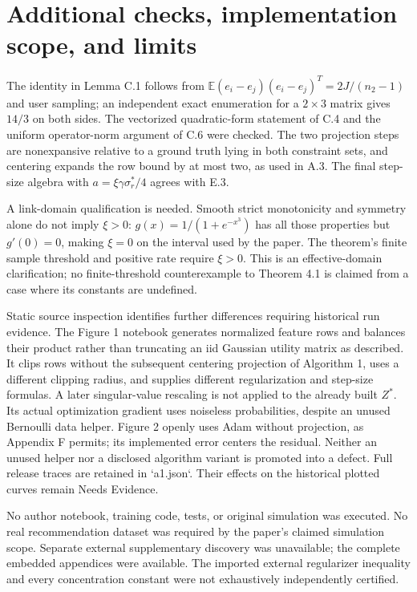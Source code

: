 \documentclass[10pt]{article}
\begin{document}
\section*{Additional checks, implementation scope, and limits}
The identity in Lemma C.1 follows from \(\mathbb E(e_i-e_j)(e_i-e_j)^T=2J/(n_2-1)\) and user sampling; an independent exact enumeration for a \(2\times3\) matrix gives \(14/3\) on both sides. The vectorized quadratic-form statement of C.4 and the uniform operator-norm argument of C.6 were checked. The two projection steps are nonexpansive relative to a ground truth lying in both constraint sets, and centering expands the row bound by at most two, as used in A.3. The final step-size algebra with \(a=\xi\gamma\sigma_r^*/4\) agrees with E.3.\par
A link-domain qualification is needed. Smooth strict monotonicity and symmetry alone do not imply \(\xi>0\): \(g(x)=1/(1+e^{-x^3})\) has all those properties but \(g'(0)=0\), making \(\xi=0\) on the interval used by the paper. The theorem’s finite sample threshold and positive rate require \(\xi>0\). This is an effective-domain clarification; no finite-threshold counterexample to Theorem 4.1 is claimed from a case where its constants are undefined.\par
Static source inspection identifies further differences requiring historical run evidence. The Figure 1 notebook generates normalized feature rows and balances their product rather than truncating an iid Gaussian utility matrix as described. It clips rows without the subsequent centering projection of Algorithm 1, uses a different clipping radius, and supplies different regularization and step-size formulas. A later singular-value rescaling is not applied to the already built \(Z^*\). Its actual optimization gradient uses noiseless probabilities, despite an unused Bernoulli data helper. Figure 2 openly uses Adam without projection, as Appendix F permits; its implemented error centers the residual. Neither an unused helper nor a disclosed algorithm variant is promoted into a defect. Full release traces are retained in `a1.json`. Their effects on the historical plotted curves remain Needs Evidence.\par
No author notebook, training code, tests, or original simulation was executed. No real recommendation dataset was required by the paper’s claimed simulation scope. Separate external supplementary discovery was unavailable; the complete embedded appendices were available. The imported external regularizer inequality and every concentration constant were not exhaustively independently certified.\par
\end{document}

